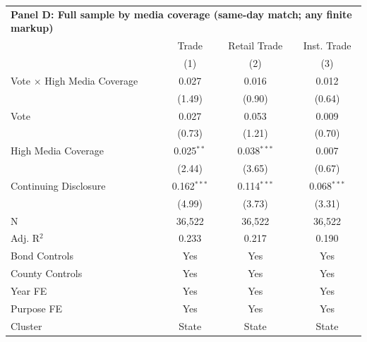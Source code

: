 \begingroup
\centering
\begin{tabular*}{\textwidth}{@{\extracolsep{\fill}}lccc}
\multicolumn{5}{l}{\textbf{Panel D: Full sample by media coverage (same-day match; any finite markup)}}\\

\addlinespace
   \toprule
                                      & Trade         & Retail Trade  & Inst. Trade\\  
                                      & (1)           & (2)           & (3)\\  
   \midrule 
   Vote $\times$ High Media Coverage  & 0.027         & 0.016         & 0.012\\   
                                      & (1.49)       & (0.90)       & (0.64)\\   
   Vote                               & 0.027         & 0.053         & 0.009\\   
                                      & (0.73)       & (1.21)       & (0.70)\\   
   High Media Coverage                & 0.025$^{**}$  & 0.038$^{***}$ & 0.007\\   
                                      & (2.44)       & (3.65)       & (0.67)\\   
   Continuing Disclosure              & 0.162$^{***}$ & 0.114$^{***}$ & 0.068$^{***}$\\   
                                      & (4.99)       & (3.73)       & (3.31)\\   
   \hline
   N                       & 36,522        & 36,522        & 36,522\\  
   Adj. R$^2$                     & 0.233         & 0.217         & 0.190\\  
   Bond Controls                      & Yes           & Yes           & Yes\\  
   County Controls                    & Yes           & Yes           & Yes\\  
   Year FE                            & Yes           & Yes           & Yes\\  
   Purpose FE                         & Yes           & Yes           & Yes\\  
   Cluster              & State & State & State\\  
   \bottomrule
\end{tabular*}
\par\endgroup
